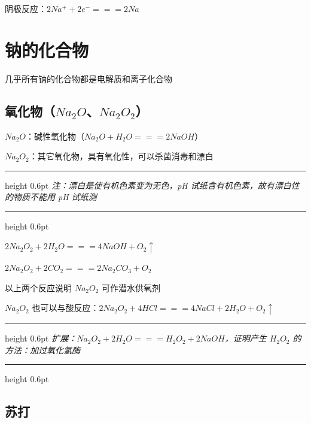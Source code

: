 \documentclass[UTF8,zihao=-4,openany]{ctexbook}
\newenvironment{notebox}
  {\par\smallskip\noindent\begingroup\begin{minipage}{\linewidth}\color{noteframe}\hrule height 0.6pt\smallskip\color{black}\itshape}
  {\par\smallskip\color{noteframe}\hrule height 0.6pt\end{minipage}\endgroup\par\smallskip}
\begin{document}
阴极反应：$2Na^++2e^-=\!=\!=2Na$\par
\section{钠的化合物}
几乎所有钠的化合物都是电解质和离子化合物\par

\subsection{氧化物（$Na_2O$、$Na_2O_2$）}
$Na_2O$：碱性氧化物（$Na_2O+H_2O=\!=\!=2NaOH$）\par

$Na_2O_2$：其它氧化物，具有氧化性，可以杀菌消毒和漂白\par
\begin{notebox}
注：漂白是使有机色素变为无色，pH 试纸含有机色素，故有漂白性的物质不能用 pH 试纸测\par
\end{notebox}
$2Na_2O_2+2H_2O=\!=\!=4NaOH+O_2\uparrow$\par

$2Na_2O_2+2CO_2=\!=\!=2Na_2CO_3+O_2$\par

以上两个反应说明 $Na_2O_2$ 可作潜水供氧剂\par

$Na_2O_2$ 也可以与酸反应：$2Na_2O_2+4HCl=\!=\!=4NaCl+2H_2O+O_2\uparrow$\par

\begin{notebox}
扩展：$Na_2O_2+2H_2O=\!=\!=H_2O_2+2NaOH$，证明产生 $H_2O_2$ 的方法：加过氧化氢酶\par
\end{notebox}
\subsection{苏打}
\begin{table}[H]
\centering
\scriptsize
\renewcommand{\arraystretch}{1.14}
\end{table}
\end{document}
